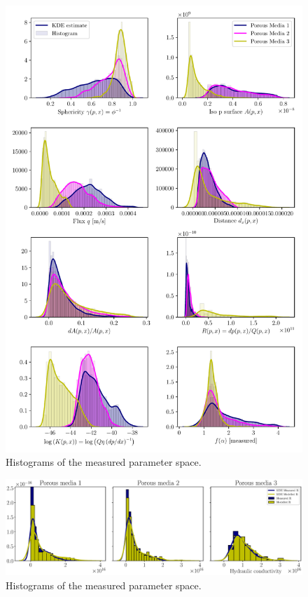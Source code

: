 \documentclass[draft,jgrga]{agutexSI2019}
\begin{document}
\begin{figure}
\noindent\includegraphics[width=15cm]{figures/histograms_parameter_space.pdf}
\caption{Histograms of the measured parameter space. }\label{Fig:Hist}
\end{figure}

\begin{figure}
\noindent\includegraphics[width=15cm]{figures/hydrualic_conductivity_integrated_histogram.eps}
\caption{Histograms of the measured parameter space. }\label{Fig:Hist}
\end{figure}
\end{document}
